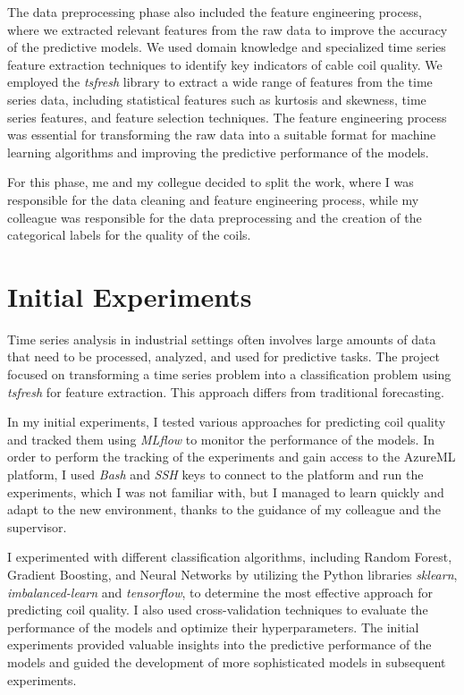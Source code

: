 The data preprocessing phase also included the feature engineering process,
where we extracted relevant features from the raw data to improve the accuracy
of the predictive models. We used domain knowledge and specialized time series
feature extraction techniques to identify key indicators of cable coil quality.
We employed the \emph{tsfresh} library to extract a wide range of features from
the time series data, including statistical features such as kurtosis and
skewness, time series features, and feature selection techniques. The feature
engineering process was essential for transforming the raw data into a suitable
format for machine learning algorithms and improving the predictive performance
of the models.

For this phase, me and my collegue decided to split the work, where I was
responsible for the data cleaning and feature engineering process, while my
colleague was responsible for the data preprocessing and the creation of the
categorical labels for the quality of the coils.

\section{Initial Experiments}

Time series analysis in industrial settings often involves large amounts of
data that need to be processed, analyzed, and used for predictive tasks. The
project focused on transforming a time series problem into a classification
problem using \emph{tsfresh} for feature extraction. This approach differs from
traditional forecasting.

In my initial experiments, I tested various approaches for predicting coil
quality and tracked them using \emph{MLflow} to monitor the performance of the
models. In order to perform the tracking of the experiments and gain access to
the AzureML platform, I used \emph{Bash} and \emph{SSH} keys to connect to the
platform and run the experiments, which I was not familiar with, but I managed
to learn quickly and adapt to the new environment, thanks to the guidance of my
colleague and the supervisor.

I experimented with different classification algorithms, including Random
Forest, Gradient Boosting, and Neural Networks by utilizing the Python
libraries \emph{sklearn}, \emph{imbalanced-learn} and \emph{tensorflow}, to
determine the most effective approach for predicting coil quality. I also used
cross-validation techniques to evaluate the performance of the models and
optimize their hyperparameters. The initial experiments provided valuable
insights into the predictive performance of the models and guided the
development of more sophisticated models in subsequent experiments.

